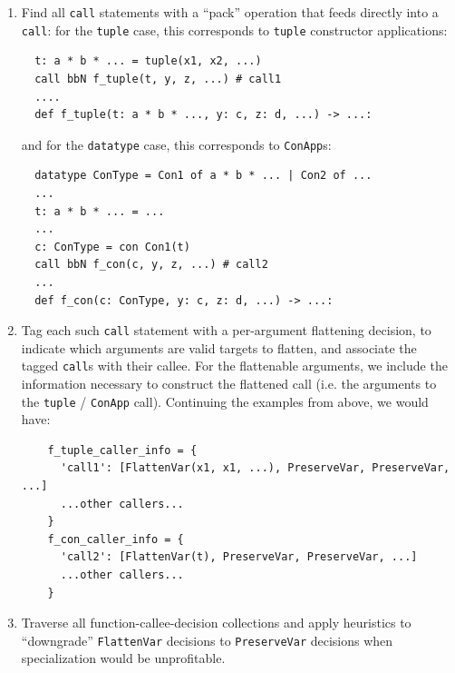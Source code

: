 \documentclass[leqno,11pt]{article}
\begin{document}
\begin{enumerate}
\item Find all \texttt{call} statements with a ``pack'' operation that feeds
  directly into a \texttt{call}: for the \texttt{tuple} case, this corresponds
  to \texttt{tuple} constructor applications:
\begin{verbatim}
  t: a * b * ... = tuple(x1, x2, ...)
  call bbN f_tuple(t, y, z, ...) # call1
  ....
  def f_tuple(t: a * b * ..., y: c, z: d, ...) -> ...:
\end{verbatim}
and for the \texttt{datatype} case, this corresponds to \texttt{ConApp}s:
\begin{verbatim}
  datatype ConType = Con1 of a * b * ... | Con2 of ...
  ...
  t: a * b * ... = ...
  ...
  c: ConType = con Con1(t)
  call bbN f_con(c, y, z, ...) # call2
  ...
  def f_con(c: ConType, y: c, z: d, ...) -> ...:
\end{verbatim}
\item Tag each such \texttt{call} statement with a per-argument flattening
  decision, to indicate which arguments are valid targets to flatten, and
  associate the tagged \texttt{call}s with their callee. For the flattenable
  arguments, we include the information necessary to construct the flattened
  call (i.e. the arguments to the \texttt{tuple} / \texttt{ConApp} call).
  Continuing the examples from above, we would have:
\begin{verbatim}
    f_tuple_caller_info = {
      'call1': [FlattenVar(x1, x1, ...), PreserveVar, PreserveVar, ...]
      ...other callers...
    }
    f_con_caller_info = {
      'call2': [FlattenVar(t), PreserveVar, PreserveVar, ...]
      ...other callers...
    }
\end{verbatim}
\item Traverse all function-callee-decision collections and apply heuristics to
  ``downgrade'' \texttt{FlattenVar} decisions to \texttt{PreserveVar} decisions
  when specialization would be unprofitable.


\end{enumerate}
\end{document}
